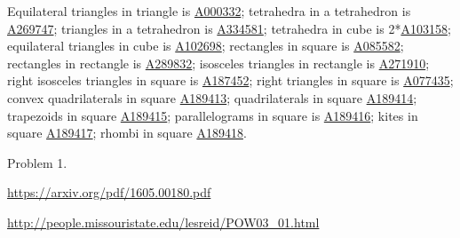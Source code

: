 \documentclass{article}
\begin{document}
\begin{note}
  Equilateral triangles in triangle is \href{https://oeis.org/A000332}{A000332};
  tetrahedra in a tetrahedron is \href{https://oeis.org/A269747}{A269747};
  triangles in a tetrahedron is \href{https://oeis.org/A334581}{A334581};
  tetrahedra in cube is 2*\href{https://oeis.org/A103158}{A103158};
  equilateral triangles in cube is \href{https://oeis.org/A102698}{A102698};
  rectangles in square is \href{https://oeis.org/A085582}{A085582};
  rectangles in rectangle is \href{https://oeis.org/A289832}{A289832};
  isosceles triangles in rectangle is \href{https://oeis.org/A271910}{A271910};
  right isosceles triangles in square is \href{https://oeis.org/A187452}{A187452};
  right triangles in square is \href{https://oeis.org/A077435}{A077435};
  convex quadrilaterals in square \href{https://oeis.org/A189413}{A189413};
  quadrilaterals in square \href{https://oeis.org/A189414}{A189414};
  trapezoids in square \href{https://oeis.org/A189415}{A189415};
  parallelograms in square is \href{https://oeis.org/A189416}{A189416};
  kites in square \href{https://oeis.org/A189417}{A189417};
  rhombi in square \href{https://oeis.org/A189418}{A189418}.
\end{note}
\begin{references}
  \item Problem 1.
  \item \url{https://arxiv.org/pdf/1605.00180.pdf}
  \item \url{http://people.missouristate.edu/lesreid/POW03_01.html}
\end{references}
\end{document}
